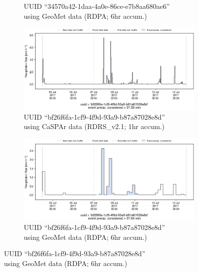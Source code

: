 \documentclass[10pt,a4paper,titlepage,parskip]{scrartcl}
\begin{document}
\begin{figure}[h]
\begin{subfigure}[a]{0.48\textwidth}
		\caption{UUID ``34570a42-1daa-4a0e-86ce-e7b8aa680ae6''\\using GeoMet data (RDPA; 6hr accum.)}
	\end{subfigure}
	\par\bigskip\bigskip
	\begin{subfigure}[b]{0.48\textwidth}
		\centering
		\includegraphics[width=\linewidth]{figures/compare_Geomet_CaSPAr/interpolated_at_stations_occurrence_1362_identified-timesteps_RDRS_v2.1.png}
		\caption{UUID ``bf26f6fa-1cf9-4f9d-93a9-b87a87028e8d''\\using CaSPAr data (RDRS\_v2.1; 1hr accum.)}
	\end{subfigure}
	\hspace*{0.05\linewidth}
	\begin{subfigure}[b]{0.48\textwidth}
		\centering
		\includegraphics[width=\linewidth]{figures/compare_Geomet_CaSPAr/interpolated_at_stations_occurrence_1362_identified-timesteps_rdpa_10km_6f.png}
		\caption{UUID ``bf26f6fa-1cf9-4f9d-93a9-b87a87028e8d''\\using GeoMet data (RDPA; 6hr accum.)}
	\end{subfigure}
	\par\bigskip\bigskip

\end{figure}
\end{document}
